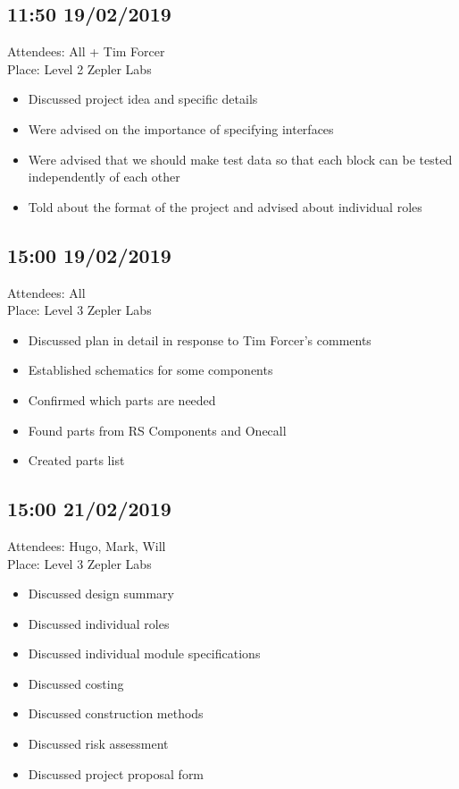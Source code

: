 \documentclass[a4paper]{article}
\begin{document}
\subsection{11:50 19/02/2019}
Attendees: All + Tim Forcer \\
Place: Level 2 Zepler Labs
\begin{itemize}
\item Discussed project idea and specific details
\item Were advised on the importance of specifying interfaces
\item Were advised that we should make test data so that each block can be tested independently of each other
\item Told about the format of the project and advised about individual roles
\end{itemize}

\subsection{15:00 19/02/2019}
Attendees: All \\
Place: Level 3 Zepler Labs
\begin{itemize}
\item Discussed plan in detail in response to Tim Forcer's comments
\item Established schematics for some components
\item Confirmed which parts are needed
\item Found parts from RS Components and Onecall
\item Created parts list
\end{itemize}

\subsection{15:00 21/02/2019}
Attendees: Hugo, Mark, Will \\
Place: Level 3 Zepler Labs
\begin{itemize}
\item Discussed design summary
\item Discussed individual roles
\item Discussed individual module specifications
\item Discussed costing
\item Discussed construction methods
\item Discussed risk assessment
\item Discussed project proposal form
\end{itemize}
\end{document}
